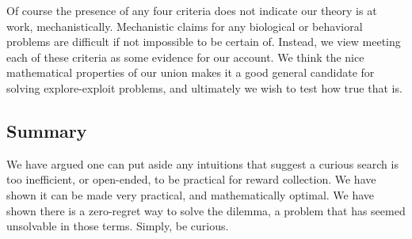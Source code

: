 Of course the presence of any four criteria does not indicate our theory is at work, mechanistically. Mechanistic claims for any biological or behavioral problems are difficult if not impossible to be certain of. Instead, we view meeting each of these criteria as some evidence for our account. We think the nice mathematical properties of our union makes it a good general candidate for solving explore-exploit problems, and ultimately we wish to test how true that is.  


\subsection*{Summary}
We have argued one can put aside any intuitions that suggest a curious search is too inefficient, or open-ended, to be practical for reward collection. We have shown it can be made very practical, and mathematically optimal. We have shown there is a zero-regret way to solve the dilemma, a problem that has seemed unsolvable in those terms. Simply, be curious.


